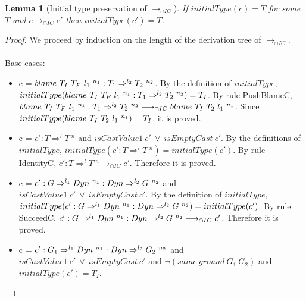 \documentclass[a4paper]{article}
\newtheorem{lemma}{Lemma}
\begin{document}
\begin{lemma}[Initial type preservation of $\longrightarrow_{\cap IC}$]
\label{initialtypepreservationIC}
If $initialType(c) = T$ for some $T$ and $c \longrightarrow_{\cap IC} c'$ then $initialType(c') = T$.
\end{lemma}
\begin{proof}
We proceed by induction on the length of the derivation tree of $\longrightarrow_{\cap IC}$.\\\\
Base cases:
\begin{itemize}
    \item c = $blame\ T_I\ T_F\ l_1\ ^{n_1} : T_1 \Rightarrow^{l_2} T_2\ ^{n_2}$.
    By the definition of $initialType$, $initialType(blame\ T_I\ T_F\ l_1\ ^{n_1} : T_1 \Rightarrow^{l_2} T_2\ ^{n_2}) = T_I$.
    By rule PushBlameC, $blame\ T_I\ T_F\ l_1\ ^{n_1} : T_1 \Rightarrow^{l_2} T_2\ ^{n_2} \longrightarrow_{\cap IC} blame\ T_I\ T_2\ l_1\ ^{n_1}$.
    Since $initialType(blame\ T_I\ T_2\ l_1\ ^{n_1}) = T_I$, it is proved.
    \begin{comment}
    \item c = $\stuckcast{T_I}{T_F}{n_1} : T_1 \Rightarrow^{l} T_2\ ^{n_2}$.
    By the definition of $initialType$, $initialType(\stuckcast{T_I}{T_F}{n_1} : T_1 \Rightarrow^{l} T_2\ ^{n_2}) = T_I$.
    By rule PushStuckC, $\stuckcast{T_I}{T_F}{n_1} : T_1 \Rightarrow^{l} T_2\ ^{n_2} \longrightarrow_{\cap IC} \stuckcast{T_I}{T_2}{n_1}$.
    Since $initialType(\stuckcast{T_I}{T_2}{n_1}) = T_I$, it is proved.
    \end{comment}
    \item c = $c' : T \Rightarrow^l T\ ^n$ and $isCastValue1\ c'\ \lor\ isEmptyCast\ c'$.
    By the definitions of $initialType$, $initialType(c' : T \Rightarrow^l T\ ^n) = initialType(c')$.
    By rule IdentityC, $c' : T \Rightarrow^l T\ ^n \longrightarrow_{\cap IC} c'$.
    Therefore it is proved.
    \item c = $c' : G \Rightarrow^{l_1} \Dyn\ ^{n_1} : \Dyn \Rightarrow^{l_2} G\ ^{n_2}$ and $isCastValue1\ c'\ \lor\ isEmptyCast\ c'$.
    By the definition of $initialType$, $initialType(c' : G \Rightarrow^{l_1} \Dyn\ ^{n_1} : \Dyn \Rightarrow^{l_2} G\ ^{n_2}) = initialType(c')$.
    By rule SucceedC, $c' : G \Rightarrow^{l_1} \Dyn\ ^{n_1} : \Dyn \Rightarrow^{l_2} G\ ^{n_2} \longrightarrow_{\cap IC} c'$.
    Therefore it is proved.
    \item c = $c' : G_1 \Rightarrow^{l_1} \Dyn\ ^{n_1} : \Dyn \Rightarrow^{l_2} G_2\ ^{n_2}$ and $isCastValue1\ c'\ \lor\ isEmptyCast\ c'$ and $\neg(same\ ground\ G_1\ G_2)$ and $initialType(c') = T_I$.

\end{itemize}
\end{proof}
\end{document}
